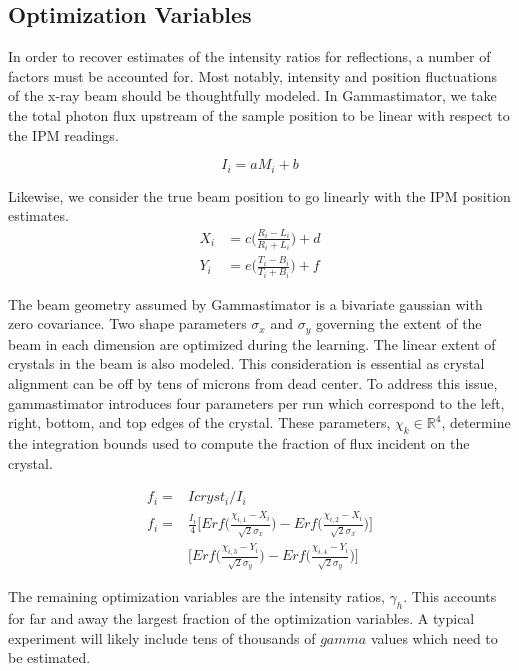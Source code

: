 \documentclass{report}
\begin{document}
\subsection{Optimization Variables}
In order to recover estimates of the intensity ratios for reflections, a number of factors must be accounted for. 
Most notably, intensity and position fluctuations of the x-ray beam should be thoughtfully modeled. 
In Gammastimator, we take the total photon flux upstream of the sample position to be linear with respect to the IPM readings.

\begin{equation}\label{eq:flux}
I_i = aM_i + b
\end{equation}

Likewise, we consider the true beam position to go linearly with the IPM position estimates.
\begin{align}
X_i &= c \bigg( \frac {R_i - L_i} {R_i + L_i}  \bigg) + d \\ \nonumber
Y_i &= e \bigg( \frac {T_i - B_i} {T_i + B_i}  \bigg) + f
\end{align}

The beam geometry assumed by Gammastimator is a bivariate gaussian with zero covariance. 
Two shape parameters $\sigma_x$ and $\sigma_y$ governing the extent of the beam in each dimension are optimized during the learning. 
The linear extent of crystals in the beam is also modeled. 
This consideration is essential as crystal alignment can be off by tens of microns from dead center. 
To address this issue, gammastimator introduces four parameters per run which correspond to the left, right, bottom, and top edges of the crystal. 
These parameters, $\chi_k \in \mathbb{R}^4$, determine the integration bounds used to compute the fraction of flux incident on the crystal. 

\begin{align}
f_i = &Icryst_i / I_i \nonumber \\
f_i = &\frac {I_i} {4}  \bigg[Erf\bigg(\frac{\chi_{i,1} - X_i} {\sqrt{2} \sigma_x}\bigg) - 
Erf\bigg(\frac{\chi_{i,2} - X_i} {\sqrt{2} \sigma_x}\bigg)\bigg] \nonumber \\ 
&\bigg[Erf\bigg(\frac{\chi_{i,3} - Y_i} {\sqrt{2} \sigma_y}\bigg) - Erf\bigg(\frac{\chi_{i,4} - Y_i} {\sqrt{2} \sigma_y}\bigg)\bigg] \nonumber
\end{align}

The remaining optimization variables are the intensity ratios, $\gamma_h$. 
This accounts for far and away the largest fraction of the optimization variables. 
A typical experiment will likely include tens of thousands of $gamma$ values which need to be estimated. 
\end{document}
